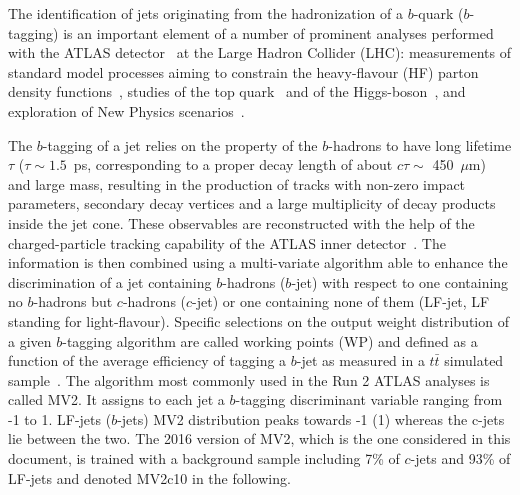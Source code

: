 \newcommand{\AtlasCoordFootnote}{%
ATLAS uses a right-handed coordinate system with its origin at the nominal interaction point (IP)
in the centre of the detector and the $z$-axis along the beam pipe.
The $x$-axis points from the IP to the centre of the LHC ring,
and the $y$-axis points upwards.
Cylindrical coordinates $(r,\phi)$ are used in the transverse plane,
$\phi$ being the azimuthal angle around the $z$-axis.
The pseudorapidity is defined in terms of the polar angle $\theta$ as $\eta = -\ln \tan(\theta/2)$.
Angular distance is measured in units of $\Delta R \equiv \sqrt{(\Delta\eta)^{2} + (\Delta\phi)^{2}}$. The transverse energy is defined as $p_{\mathrm{T}} = E / \cosh(\eta)$.}


The identification of jets originating from the hadronization of a $b$-quark ($b$-tagging) is an important element of a number of prominent analyses performed with the ATLAS detector~\cite{PERF-2007-01} at the Large Hadron Collider (LHC): measurements of standard model processes aiming to constrain the heavy-flavour (HF) parton density functions~\cite{photon_hf}, studies of the top quark~\cite{TOPQ-2013-04} and of the Higgs-boson~\cite{Hbb,ttHtobb}, and exploration of New Physics scenarios~\cite{ttbar_MET, EXOT-2016-12}.

The $b$-tagging of a jet relies on the property of the $b$-hadrons to have long lifetime $\tau$ (${\tau\sim1.5}$~ps, corresponding to a proper decay length of about $c\tau\sim$ 450~$\mu$m) and large mass, resulting in the production of tracks with non-zero impact parameters, secondary decay vertices and a large multiplicity of decay products inside the jet cone. These observables are reconstructed with the help of the charged-particle tracking capability of the ATLAS inner detector~\cite{PERF-2012-04}. The information is then combined using a multi-variate algorithm able to enhance the discrimination of a jet containing $b$-hadrons ($b$-jet) with respect to one containing no $b$-hadrons but $c$-hadrons ($c$-jet) or one containing none of them (LF-jet, LF standing for light-flavour). Specific selections on the output weight distribution of a given $b$-tagging algorithm are called working points (WP) and defined as a function of the average efficiency of tagging a $b$-jet as measured in a $t\bar{t}$ simulated sample~\cite{perf_run2,perf_run2_2}. The algorithm most commonly used in the Run 2 ATLAS analyses is called MV2. It assigns to each jet a $b$-tagging discriminant variable ranging from -1 to 1. LF-jets ($b$-jets) MV2 distribution peaks towards -1 (1) whereas the c-jets lie between the two. The 2016 version of MV2, which is the one considered in this document, is trained with a background sample including 7\% of $c$-jets and 93\% of LF-jets and denoted MV2c10 in the following.


